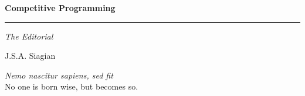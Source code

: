 \documentclass[11pt,a4paper,oneside]{article}
\begin{document}
\hypersetup{pageanchor=false}
\begin{titlepage}
  \centering
  \vspace*{0.28\textheight}
  {\fontsize{34}{40}\selectfont\bfseries Competitive Programming\par}
  \vspace{12pt}
  {\color{thmcolor}\rule{0.35\textwidth}{1.2pt}\par}
  \vspace{12pt}
  {\fontsize{14.4}{18}\selectfont\itshape The Editorial\par}
  \vfill
  {\fontsize{12}{14.5}\selectfont J.S.A. Siagian\par}
  \vspace{6pt}
  {\fontsize{10.5}{13}\selectfont\color{muted}\textit{Nemo nascitur sapiens, sed fit}\\No one is born wise, but becomes so.\par}
  \vspace{4pt}
\end{titlepage}
\hypersetup{pageanchor=true}



{\hypersetup{linkcolor=ink}\tableofcontents}
\clearpage











\end{document}
